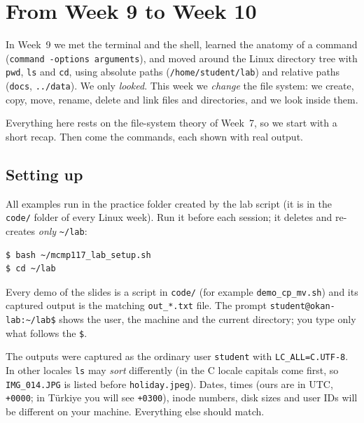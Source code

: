\documentclass[11pt,a4paper]{article}
\newcommand{\cmd}[1]{\texttt{#1}}
\begin{document}
\setcounter{tocdepth}{1}
\tableofcontents

\section{From Week 9 to Week 10}

In Week~9 we met the terminal and the shell, learned the anatomy of a command (\texttt{command}\ \texttt{-options}\ \texttt{arguments}), and moved around the Linux directory tree with \cmd{pwd}, \cmd{ls} and \cmd{cd}, using absolute paths (\texttt{/home/\allowbreak student/\allowbreak lab}) and relative paths (\texttt{docs}, \texttt{../data}). We only \emph{looked}. This week we \emph{change} the file system: we create, copy, move, rename, delete and link files and directories, and we look inside them.

Everything here rests on the file-system theory of Week~7, so we start with a short recap. Then come the commands, each shown with real output.

\subsection*{Setting up}

All examples run in the practice folder created by the lab script (it is in the \cmd{code/} folder of every Linux week). Run it before each session; it deletes and re-creates \emph{only} \texttt{\textasciitilde/lab}:
\begin{lstlisting}[style=term]
$ bash ~/mcmp117_lab_setup.sh
$ cd ~/lab
\end{lstlisting}
Every demo of the slides is a script in \cmd{code/} (for example \cmd{demo\_cp\_mv.sh}) and its captured output is the matching \cmd{out\_*.txt} file. The prompt \texttt{student@okan-lab:\textasciitilde/lab\$} shows the user, the machine and the current directory; you type only what follows the \texttt{\$}.

\begin{keyidea}
The outputs were captured as the ordinary user \texttt{student} with \texttt{LC\_ALL=C.UTF-8}. In other locales \cmd{ls} may \emph{sort} differently (in the C locale capitals come first, so \texttt{IMG\_014.JPG} is listed before \texttt{holiday.jpeg}). Dates, times (ours are in UTC, \texttt{+0000}; in Türkiye you will see \texttt{+0300}), inode numbers, disk sizes and user IDs will be different on your machine. Everything else should match.
\end{keyidea}
\end{document}
